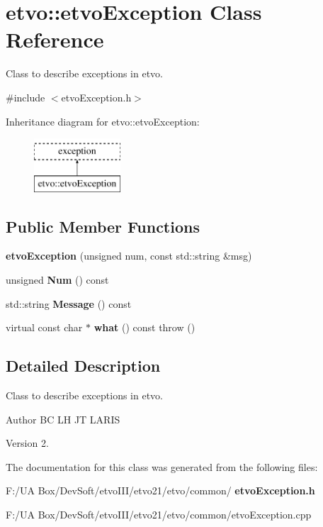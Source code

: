 \section{etvo\+:\+:etvo\+Exception Class Reference}
\label{classetvo_1_1etvo_exception}


Class to describe exceptions in etvo.  




{\ttfamily \#include $<$etvo\+Exception.\+h$>$}

Inheritance diagram for etvo\+:\+:etvo\+Exception\+:\begin{figure}[H]
\begin{center}
\leavevmode
\includegraphics[height=2.000000cm]{classetvo_1_1etvo_exception}
\end{center}
\end{figure}
\subsection*{Public Member Functions}
\begin{DoxyCompactItemize}
\item 
\mbox{\label{classetvo_1_1etvo_exception_af7dacddeb97be42652d39041e8ae8bce}} 
{\bfseries etvo\+Exception} (unsigned num, const std\+::string \&msg)
\item 
\mbox{\label{classetvo_1_1etvo_exception_ae0497a9cc6a09ad55c0a6adc879b2af7}} 
unsigned {\bfseries Num} () const
\item 
\mbox{\label{classetvo_1_1etvo_exception_a124cbbeab0fb4c3701f1a564662b13c5}} 
std\+::string {\bfseries Message} () const
\item 
\mbox{\label{classetvo_1_1etvo_exception_a5727cd8a0d7165e46d5e3877b297773f}} 
virtual const char $\ast$ {\bfseries what} () const  throw ()
\end{DoxyCompactItemize}


\subsection{Detailed Description}
Class to describe exceptions in etvo. 

\begin{DoxyAuthor}{Author}
BC LH JT L\+A\+R\+IS 
\end{DoxyAuthor}
\begin{DoxyVersion}{Version}
2. 
\end{DoxyVersion}


The documentation for this class was generated from the following files\+:\begin{DoxyCompactItemize}
\item 
F\+:/\+U\+A Box/\+Dev\+Soft/etvo\+I\+I\+I/etvo21/etvo/common/\textbf{ etvo\+Exception.\+h}\item 
F\+:/\+U\+A Box/\+Dev\+Soft/etvo\+I\+I\+I/etvo21/etvo/common/etvo\+Exception.\+cpp\end{DoxyCompactItemize}
